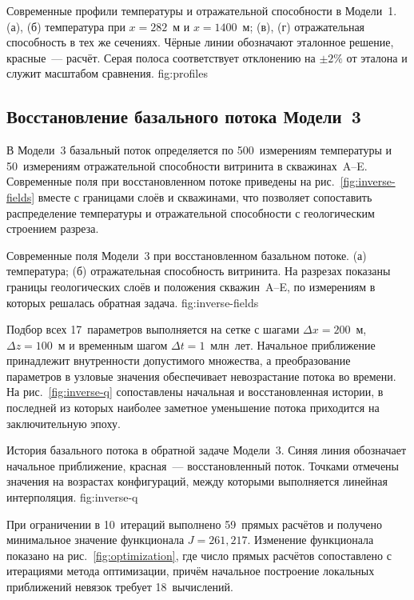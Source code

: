  {Современные профили температуры и отражательной способности в Модели~1. (а), (б) температура при $x=282$~м и $x=1400$~м; (в), (г) отражательная способность в тех же сечениях. Чёрные линии обозначают эталонное решение, красные~--- расчёт. Серая полоса соответствует отклонению на $\pm2\%$ от эталона и служит масштабом сравнения.} {fig:profiles}
\FloatBarrier

\subsection{Восстановление базального потока Модели~3}

В Модели~3 базальный поток определяется по 500~измерениям температуры и 50~измерениям отражательной способности витринита в скважинах~A--E. Современные поля при восстановленном потоке приведены на рис.~\ref{fig:inverse-fields} вместе с границами слоёв и скважинами, что позволяет сопоставить распределение температуры и отражательной способности с геологическим строением разреза.

 {Современные поля Модели~3 при восстановленном базальном потоке. (а) температура; (б) отражательная способность витринита. На разрезах показаны границы геологических слоёв и положения скважин~A--E, по измерениям в которых решалась обратная задача.} {fig:inverse-fields}

Подбор всех 17~параметров выполняется на сетке с шагами $\Delta x=200$~м, $\Delta z=100$~м и временным шагом $\Delta t=1$~млн~лет. Начальное приближение принадлежит внутренности допустимого множества, а преобразование параметров в узловые значения обеспечивает невозрастание потока во времени. На рис.~\ref{fig:inverse-q} сопоставлены начальная и восстановленная истории, в последней из которых наиболее заметное уменьшение потока приходится на заключительную эпоху.

 {История базального потока в обратной задаче Модели~3. Синяя линия обозначает начальное приближение, красная~--- восстановленный поток. Точками отмечены значения на возрастах конфигураций, между которыми выполняется линейная интерполяция.} {fig:inverse-q}

При ограничении в 10~итераций выполнено 59~прямых расчётов и получено минимальное значение функционала $J=261{,}217$. Изменение функционала показано на рис.~\ref{fig:optimization}, где число прямых расчётов сопоставлено с итерациями метода оптимизации, причём начальное построение локальных приближений невязок требует 18~вычислений.

